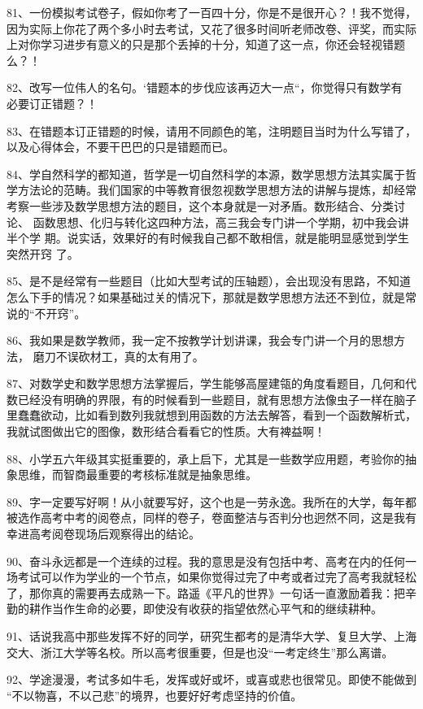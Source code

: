 \documentclass[11pt]{ctexart}
\begin{document}
{{{{81、一份模拟考试卷子，假如你考了一百四十分，你是不是很开心？！我不觉得，
因为实际上你花了两个多小时去考试，又花了很多时间听老师改卷、评奖，而实际
上对你学习进步有意义的只是那个丢掉的十分，知道了这一点，你还会轻视错题
么？！


82、改写一位伟人的名句。‘错题本的步伐应该再迈大一点“，你觉得只有数学有
必要订正错题？！


83、在错题本订正错题的时候，请用不同颜色的笔，注明题目当时为什么写错了，
以及心得体会，不要干巴巴的只是错题而已。


84、学自然科学的都知道，哲学是一切自然科学的本源，数学思想方法其实属于哲
学方法论的范畴。我们国家的中等教育很忽视数学思想方法的讲解与提炼，却经常
考察一些涉及数学思想方法的题目，这个本身就是一对矛盾。数形结合、分类讨论、
函数思想、化归与转化这四种方法，高三我会专门讲一个学期，初中我会讲半个学
期。说实话，效果好的有时候我自己都不敢相信，就是能明显感觉到学生突然开窍
了。


85、是不是经常有一些题目（比如大型考试的压轴题），会出现没有思路，不知道
怎么下手的情况？如果基础过关的情况下，那就是数学思想方法还不到位，就是常
说的“不开窍”。


86、我如果是数学教师，我一定不按教学计划讲课，我会专门讲一个月的思想方法，
磨刀不误砍材工，真的太有用了。


87、对数学史和数学思想方法掌握后，学生能够高屋建瓴的角度看题目，几何和代
数已经没有明确的界限，有的时候看到一些题目，就有思想方法像虫子一样在脑子
里蠢蠢欲动，比如看到数列我就想到用函数的方法去解答，看到一个函数解析式，
我就试图做出它的图像，数形结合看看它的性质。大有裨益啊！


88、小学五六年级其实挺重要的，承上启下，尤其是一些数学应用题，考验你的抽
象思维，而智商最重要的考核标准就是抽象思维。


89、字一定要写好啊！从小就要写好，这个也是一劳永逸。我所在的大学，每年都
被选作高考中考的阅卷点，同样的卷子，卷面整洁与否判分也迥然不同，这是我有
幸进高考阅卷现场后观察得出的结论。


90、奋斗永远都是一个连续的过程。我的意思是没有包括中考、高考在内的任何一
场考试可以作为学业的一个节点，如果你觉得过完了中考或者过完了高考我就轻松
了，那你真的需要再去成熟一下。路遥《平凡的世界》一句话一直激励着我：把辛
勤的耕作当作生命的必要，即使没有收获的指望依然心平气和的继续耕种。


91、话说我高中那些发挥不好的同学，研究生都考的是清华大学、复旦大学、上海
交大、浙江大学等名校。所以高考很重要，但是也没“一考定终生”那么离谱。


92、学途漫漫，考试多如牛毛，发挥或好或坏，或喜或悲也很常见。即使不能做到
“不以物喜，不以己悲”的境界，也要好好考虑坚持的价值。

}}}}
\end{document}
